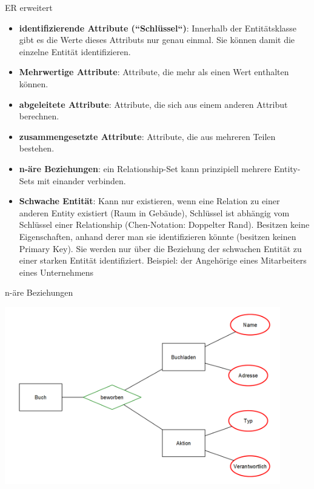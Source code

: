 \begin{frame}[allowframebreaks]{ER erweitert}
    \begin{itemize}
        \item \textbf{identifizierende Attribute (``Schlüssel``)}: Innerhalb der Entitätsklasse gibt es die Werte dieses Attributs nur genau einmal. Sie können damit die einzelne Entität identifizieren.
        \item \textbf{Mehrwertige Attribute}: Attribute, die mehr als einen Wert enthalten können.
        \item \textbf{abgeleitete Attribute}: Attribute, die sich aus einem anderen Attribut berechnen.
        \item \textbf{zusammengesetzte Attribute}: Attribute, die aus mehreren Teilen bestehen.
    \end{itemize}
    \begin{itemize}
        \item \textbf{n-äre Beziehungen}: ein Relationship-Set kann prinzipiell mehrere Entity-Sets mit einander verbinden.
        \item \textbf{Schwache Entität}: Kann nur existieren, wenn eine Relation zu einer anderen Entity existiert (Raum in Gebäude), Schlüssel ist abhängig vom Schlüssel einer Relationship (Chen-Notation: Doppelter Rand). Besitzen keine Eigenschaften, anhand derer man sie identifizieren könnte (besitzen keinen Primary Key). Sie werden nur über die Beziehung der schwachen Entität zu einer starken Entität identifiziert. Beispiel: der Angehörige eines Mitarbeiters eines Unternehmens
    \end{itemize}
\end{frame}

    
\begin{frame}{n-äre Beziehungen}
\begin{center}
    \includegraphics[width=0.9\textwidth]{img/n-ary-relationship.png}
\end{center}    
\end{frame}


